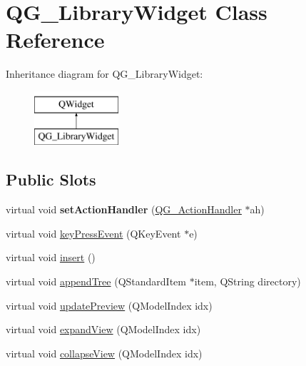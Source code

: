 \hypertarget{classQG__LibraryWidget}{\section{Q\-G\-\_\-\-Library\-Widget Class Reference}
\label{classQG__LibraryWidget}
}
Inheritance diagram for Q\-G\-\_\-\-Library\-Widget\-:\begin{figure}[H]
\begin{center}
\leavevmode
\includegraphics[height=2.000000cm]{classQG__LibraryWidget}
\end{center}
\end{figure}
\subsection*{Public Slots}
\begin{DoxyCompactItemize}
\item 
\hypertarget{classQG__LibraryWidget_a851f0c7c3ac6e65527939b9f48fddbdf}{virtual void {\bfseries set\-Action\-Handler} (\hyperlink{classQG__ActionHandler}{Q\-G\-\_\-\-Action\-Handler} $\ast$ah)}\label{classQG__LibraryWidget_a851f0c7c3ac6e65527939b9f48fddbdf}

\item 
virtual void \hyperlink{classQG__LibraryWidget_a445311ed0c18382dd42e0aa62dc7eb7b}{key\-Press\-Event} (Q\-Key\-Event $\ast$e)
\item 
virtual void \hyperlink{classQG__LibraryWidget_a6e8f2cf6e5dcf3dc1c17069bf3cc5076}{insert} ()
\item 
virtual void \hyperlink{classQG__LibraryWidget_a0167c4c30dccaa42ed13392b78fdf98a}{append\-Tree} (Q\-Standard\-Item $\ast$item, Q\-String directory)
\item 
virtual void \hyperlink{classQG__LibraryWidget_a1af395083858346ff9640f49717a3c61}{update\-Preview} (Q\-Model\-Index idx)
\item 
virtual void \hyperlink{classQG__LibraryWidget_ae41664d92820d774c5f777998f500ef7}{expand\-View} (Q\-Model\-Index idx)
\item 
virtual void \hyperlink{classQG__LibraryWidget_a3e7ed5a76b83fc1151f0b597108e4524}{collapse\-View} (Q\-Model\-Index idx)
\end{DoxyCompactItemize}
